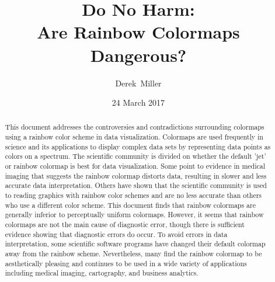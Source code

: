 \documentclass[journal]{IEEEtran}
\title{Do No Harm: \\ Are Rainbow Colormaps Dangerous?}
\author{Derek~Miller}%
\date{24 March 2017}
\begin{document}
\begin{titlepage}
\maketitle
\end{titlepage}

\tableofcontents
\begin{abstract}
This document addresses the controversies and contradictions
surrounding colormaps using a rainbow color scheme in data visualization.
Colormaps are used frequently in science and its applications
to display complex data sets by
representing data points as colors on a spectrum. The scientific
community is divided on whether the default 'jet' or rainbow colormap
is best for data visualization. Some point to evidence in medical imaging
that suggests the rainbow colormap distorts data, resulting in slower and 
less accurate data interpretation. Others have shown that the
scientific community is used to reading graphics with rainbow
color schemes and are no less accurate than others who use
a different color scheme. This document finds that rainbow colormaps
are generally inferior to perceptually uniform colormaps. However, it
seems that rainbow colormaps are not the main cause of diagnostic error,
though there is sufficient evidence showing that diagnostic errors do occur.
To avoid errors in data interpretation, some scientific software programs
have changed their default colormap away from the rainbow scheme.
Nevertheless, many find the rainbow colormap to be aesthetically pleasing
and continues to be used in a wide variety of applications including medical imaging,
cartography, and business analytics.
\end{abstract}

\IEEEpeerreviewmaketitle
\end{document}
